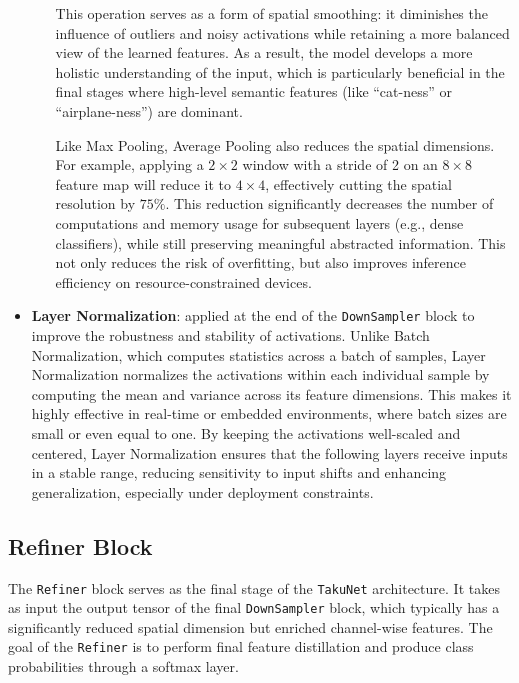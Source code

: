 \begin{itemize}
\begin{itemize}
    This operation serves as a form of spatial smoothing: it diminishes the influence of outliers and noisy activations while retaining a more balanced view of the learned features. As a result, the model develops a more holistic understanding of the input, which is particularly beneficial in the final stages where high-level semantic features (like “cat-ness” or “airplane-ness”) are dominant.
    
    Like Max Pooling, Average Pooling also reduces the spatial dimensions. For example, applying a $2 \times 2$ window with a stride of 2 on an $8 \times 8$ feature map will reduce it to $4 \times 4$, effectively cutting the spatial resolution by $75\%$. This reduction significantly decreases the number of computations and memory usage for subsequent layers (e.g., dense classifiers), while still preserving meaningful abstracted information. This not only reduces the risk of overfitting, but also improves inference efficiency on resource-constrained devices.
  \end{itemize}
  
    \item \textbf{Layer Normalization}: applied at the end of the \texttt{DownSampler} block to improve the robustness and stability of activations. Unlike Batch Normalization, which computes statistics across a batch of samples, Layer Normalization normalizes the activations within each individual sample by computing the mean and variance across its feature dimensions. This makes it highly effective in real-time or embedded environments, where batch sizes are small or even equal to one. By keeping the activations well-scaled and centered, Layer Normalization ensures that the following layers receive inputs in a stable range, reducing sensitivity to input shifts and enhancing generalization, especially under deployment constraints.
    
\end{itemize}

\subsection{Refiner Block}

The \texttt{Refiner} block serves as the final stage of the \texttt{TakuNet} architecture. It takes as input the output tensor of the final \texttt{DownSampler} block, which typically has a significantly reduced spatial dimension but enriched channel-wise features. The goal of the \texttt{Refiner} is to perform final feature distillation and produce class probabilities through a softmax layer.

